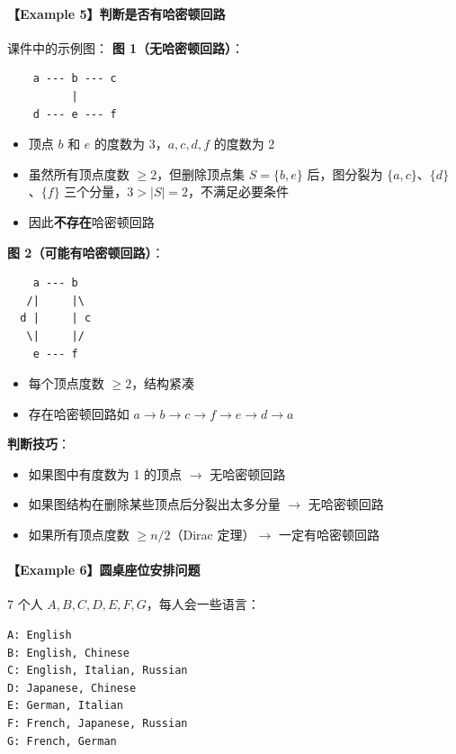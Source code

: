 \documentclass[10pt,a4paper,openany]{ctexbook}
\theoremstyle{definition}
\theoremstyle{remark}
\begin{document}
\paragraph{【Example 5】判断是否有哈密顿回路}

课件中的示例图：
\textbf{图 1（无哈密顿回路）}：
{\footnotesize\begin{verbatim}
    a --- b --- c
          |
    d --- e --- f
\end{verbatim}}

\begin{itemize}
\item 顶点 $b$ 和 $e$ 的度数为 3，$a,c,d,f$ 的度数为 2
\item 虽然所有顶点度数 $\ge 2$，但删除顶点集 $S = \{b, e\}$ 后，图分裂为 $\{a,c\}$、$\{d\}$、$\{f\}$ 三个分量，$3 > |S| = 2$，不满足必要条件
\item 因此\textbf{不存在}哈密顿回路

\end{itemize}

\textbf{图 2（可能有哈密顿回路）}：
{\footnotesize\begin{verbatim}
    a --- b
   /|     |\
  d |     | c
   \|     |/
    e --- f
\end{verbatim}}

\begin{itemize}
\item 每个顶点度数 $\ge 2$，结构紧凑
\item 存在哈密顿回路如 $a \to b \to c \to f \to e \to d \to a$

\end{itemize}

\textbf{判断技巧}：
\begin{itemize}
\item 如果图中有度数为 1 的顶点 $\rightarrow$ 无哈密顿回路
\item 如果图结构在删除某些顶点后分裂出太多分量 $\rightarrow$ 无哈密顿回路
\item 如果所有顶点度数 $\ge n/2$（Dirac 定理）$\rightarrow$ 一定有哈密顿回路

\end{itemize}

\paragraph{【Example 6】圆桌座位安排问题}

7 个人 $A, B, C, D, E, F, G$，每人会一些语言：
{\footnotesize\begin{verbatim}
A: English
B: English, Chinese
C: English, Italian, Russian
D: Japanese, Chinese
E: German, Italian
F: French, Japanese, Russian
G: French, German
\end{verbatim}}
\end{document}
